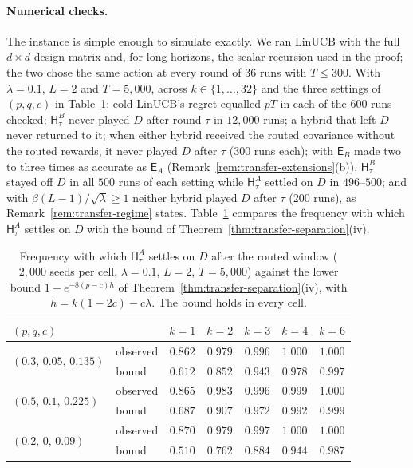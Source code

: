 \documentclass{article}
\theoremstyle{definition}
\theoremstyle{remark}
\theoremstyle{remark}
\newcommand{\Exp}{\mathsf{E}}
\newcommand{\Hyb}{\mathsf{H}}
\begin{document}
\paragraph{Numerical checks.}
The instance is simple enough to simulate exactly. We ran LinUCB with the full
$d\times d$ design matrix and, for long horizons, the scalar recursion used in
the proof; the two chose the same action at every round of $36$ runs with
$T\le300$. With $\lambda=0.1$, $L=2$ and $T=5{,}000$, across $k\in\{1,\dots,32\}$
and the three settings of $(p,q,c)$ in Table~\ref{tab:transfer-check}: cold
LinUCB's regret equalled $pT$ in each of the $600$ runs checked;
$\Hyb^B_\tau$ never played $D$ after round $\tau$ in $12{,}000$ runs; a hybrid
that left $D$ never returned to it; when either hybrid received the routed
covariance without the routed rewards, it never played $D$ after $\tau$
($300$ runs each); with $\Exp_B$ made two to three times as accurate as
$\Exp_A$ (Remark~\ref{rem:transfer-extensions}(b)), $\Hyb^B_\tau$ stayed off
$D$ in all $500$ runs of each setting while $\Hyb^A_\tau$ settled on $D$ in
$496$--$500$; and with $\beta(L-1)/\sqrt\lambda\ge1$ neither hybrid played $D$
after $\tau$ ($200$ runs), as Remark~\ref{rem:transfer-regime} states.
Table~\ref{tab:transfer-check} compares the frequency with which
$\Hyb^A_\tau$ settles on $D$ with the bound of
Theorem~\ref{thm:transfer-separation}(iv).

\begin{table}[h]
\centering
\caption{Frequency with which $\Hyb^A_\tau$ settles on $D$ after the routed
window ($2{,}000$ seeds per cell, $\lambda=0.1$, $L=2$, $T=5{,}000$) against the
lower bound $1-e^{-8(p-c)h}$ of Theorem~\ref{thm:transfer-separation}(iv),
with $h=k(1-2c)-c\lambda$. The bound holds in every cell.}
\label{tab:transfer-check}
\small
\begin{tabular}{@{}llccccc@{}}
\toprule
$(p,q,c)$ & & $k=1$ & $k=2$ & $k=3$ & $k=4$ & $k=6$ \\
\midrule
\multirow{2}{*}{$(0.3,\,0.05,\,0.135)$} & observed & $0.862$ & $0.979$ & $0.996$ & $1.000$ & $1.000$ \\
 & bound & $0.612$ & $0.852$ & $0.943$ & $0.978$ & $0.997$ \\
\midrule
\multirow{2}{*}{$(0.5,\,0.1,\,0.225)$} & observed & $0.865$ & $0.983$ & $0.996$ & $0.999$ & $1.000$ \\
 & bound & $0.687$ & $0.907$ & $0.972$ & $0.992$ & $0.999$ \\
\midrule
\multirow{2}{*}{$(0.2,\,0,\,0.09)$} & observed & $0.870$ & $0.979$ & $0.997$ & $1.000$ & $1.000$ \\
 & bound & $0.510$ & $0.762$ & $0.884$ & $0.944$ & $0.987$ \\
\bottomrule
\end{tabular}
\end{table}
\end{document}
